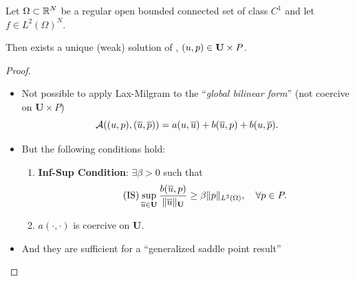 \SetEmptyBackground
\begin{frame}
    \begin{theorem}
      Let $\Omega\subset\Rset^N$ be a regular open bounded connected set of
      class $C^1$ and let $f\in L^2(\Omega)^N$.
      \par\smallskip Then \alert{exists a unique
      (weak) solution of \steadyStokes}, $(\uu,p)\in \mathbf{U}\times P$.
    \end{theorem}
    \begin{proof}
      \small
      \begin{itemize}
        \setlength{\itemsep}{0.5em}
      \item \small{Not possible to apply Lax-Milgram to the ``\textit{global bilinear
        form}'' (not coercive on $\textbf{U}\times P$)}
        \vspace{-0.5em}
        $$
        {\cal A}((\uu,\pp),(\bu,\bp))=a(\uu,\bu)+b(\bu,\pp)+b(\uu,\bp).
        $$
        \vspace{-1.5em}
      \item But the following conditions hold:
        \begin{enumerate}
        \item  \alert{\textbf{Inf-Sup
              Condition}}: $\exists\beta>0$ such that
          \begin{equation}
            \tag{IS}
            \sup_{\bu\in\mathbf{U}}\frac{b(\bu,p)}{\norm[\mathbf{U}]{\bu}} \ge \beta \norm[L^2(\Omega)]{p}, \quad \forall p\in P.
          \end{equation}
          \vspace{-0.5em}
        \item $a(\cdot,\cdot)$ is coercive on \textbf{U}.
        \end{enumerate}
      \item And they are sufficient for a ``generalized saddle point result''  \cite{Boffi-Brezzi-Fortin:08}
      \end{itemize}
    \end{proof}
\end{frame}

